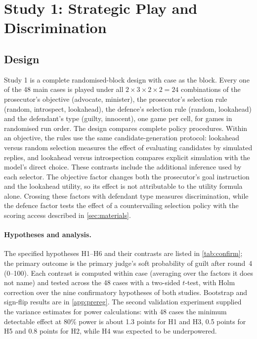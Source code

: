 \section{Study 1: Strategic Play and Discrimination}\label{sec:study1}

\subsection{Design}
Study 1 is a complete randomised-block design with case as the block. Every one of the 48 main cases is played under all
$2\times3\times2\times2=24$ combinations of the prosecutor's objective (advocate, minister), the prosecutor's selection
rule (random, introspect, lookahead), the defence's selection rule (random, lookahead) and the defendant's type
(guilty, innocent), one game per cell, for \SoneNgames{} games in randomised run order. The design compares complete policy procedures. Within an objective, the rules use the same candidate-generation
protocol: lookahead versus random selection measures the effect of evaluating candidates by simulated replies,
and lookahead versus introspection compares explicit simulation with the model's direct choice. These contrasts
include the additional inference used by each selector. The objective factor changes both the prosecutor's goal
instruction and the lookahead utility, so its effect is not attributable to the utility formula alone. Crossing
these factors with defendant type measures discrimination, while the defence factor tests the effect of a
countervailing selection policy with the scoring access described in \cref{sec:materials}.

\paragraph{Hypotheses and analysis.} The specified hypotheses H1--H6 and their contrasts are listed in
\cref{tab:confirm}; the primary outcome is the primary judge's soft probability of guilt after round~4 (0--100). Each
contrast is computed within case (averaging over the factors it does not name) and tested across the 48 cases with a
two-sided $t$-test, with Holm correction over the nine confirmatory hypotheses of both studies. Bootstrap and sign-flip
results are in \cref{app:prereg}. The second validation experiment supplied the variance estimates for power calculations: with 48 cases the minimum detectable effect at 80\% power
is about 1.3 points for H1 and H3, 0.5 points for H5 and 0.8 points for H2, while H4 was expected to be underpowered.

